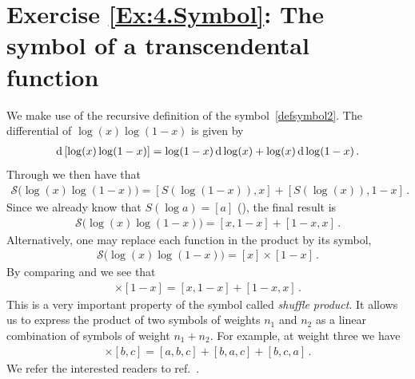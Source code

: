 

\section*{Exercise \ref{Ex:4.Symbol}: The symbol of a transcendental function}
\label{Sol:4.Symbol}
%
We make use of the recursive definition of the symbol~\eqref{defsymbol2}. 
The differential of $\log(x) \log (1-x)$ is given by
\begin{align}
\mathrm{d} \left[ \log(x) \log (1-x) \right] =  \log (1-x) \, \mathrm{d} \log(x) +  \log (x) \, \mathrm{d} \log (1-x)  \,.
\end{align}
Through  we then have that 
\begin{align}
\mathcal{S}\bigl( \log(x) \log (1-x) \bigr) = [ S(\log(1-x)) , x ] + [ S(\log(x)), 1-x] \,.
\end{align}
Since we already know that $S(\log a) = [a]$ (), the final result is
\begin{align} \label{eq:sloglog1}
\mathcal{S}\bigl( \log(x) \log (1-x) \bigr) = [x, 1-x] + [1-x, x] \,.
\end{align} 
%
Alternatively, one may replace each function in the product by its symbol,
\begin{align} \label{eq:sloglog2}
\mathcal{S}\bigl( \log(x) \log (1-x) \bigr) = [x] \times [1-x]  \,.
\end{align}
By comparing  and  we see that
\begin{align}
[x] \times [1-x] = [x,1-x] + [1-x, x] \,.
\end{align}
This is a very important property of the symbol called \emph{shuffle product}. It allows us to express the product of two symbols of weights $n_1$ and $n_2$ as a linear combination of symbols of weight $n_1+n_2$. For example, at weight three we have
\begin{align}
[a] \times [b,c] = [a,b,c] + [b,a,c] + [b,c,a] \,.
\end{align}
We refer the interested readers to ref.~\cite{ch5-Duhr:2019tlz}.



